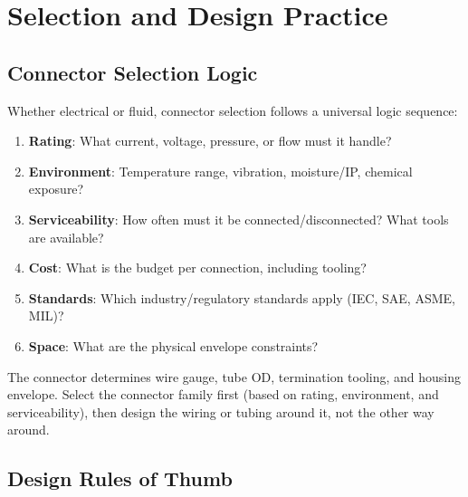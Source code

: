 \section{Selection and Design Practice}

\subsection{Connector Selection Logic}

Whether electrical or fluid, connector selection follows a universal logic sequence:

\begin{enumerate}[leftmargin=1.5em]
  \item \textbf{Rating}: What current, voltage, pressure, or flow must it handle?
  \item \textbf{Environment}: Temperature range, vibration, moisture/IP, chemical exposure?
  \item \textbf{Serviceability}: How often must it be connected/disconnected? What tools are available?
  \item \textbf{Cost}: What is the budget per connection, including tooling?
  \item \textbf{Standards}: Which industry/regulatory standards apply (IEC, SAE, ASME, MIL)?
  \item \textbf{Space}: What are the physical envelope constraints?
\end{enumerate}



\begin{tipbox}
The connector determines wire gauge, tube OD, termination tooling, and housing envelope. Select the connector family first (based on rating, environment, and serviceability), then design the wiring or tubing around it, not the other way around.
\end{tipbox}

\subsection{Design Rules of Thumb}

